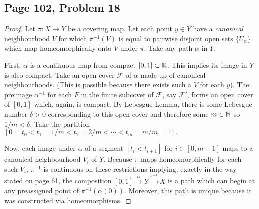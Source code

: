 \subsection*{Page 102, Problem 18}
\vspace{15pt}
\begin{proof}
    \vspace{-10pt}
    Let $\pi\colon X\to Y$ be a covering map. Let each point $y \in Y$ have a \emph{canonical} neighbourhood $V$ for which $\pi^{-1}(V)$ is equal to pairwise disjoint open sets $\{U_\alpha\}$ which map homeomorphically onto $V$ under $\pi$. Take any path $\alpha$ in $Y$.

    First, $\alpha$ is a continuous map from compact $[0,1] \subset \mathbb{R}$. This implies its image in $Y$ is also compact. Take an open cover $\mathscr{F}$ of $\alpha$ made up of canonical neighbourhoods. (This is possible because there exists such a $V$ for each $y$). The preimage $\alpha^{-1}$ for each $F$ in the finite subcover of $\mathscr{F}$, say $\mathscr{F'}$, forms an open cover of $[0,1]$ which, again, is compact. By Lebesgue Lemma, there is some Lebesgue number $\delta > 0$ corresponding to this open cover and therefore some $m \in \mathbb{N}$ so $1/m < \delta.$ Take the partition $[0 = t_0 < t_1 = 1/m < t_2 = 2/m < \cdots < t_m = m/m = 1].$

    Now, each image under $\alpha$ of a segment $[t_i < t_{i+1}]$ for $i \in [0,m-1]$ maps to a canonical neighbourhood $V_i$ of $Y.$ Because $\pi$ maps homeomorphically for each such $V_i$, $\pi^{-1}$ is continuous on these restrictions implying, exactly in the way stated on page 61, the composition $[0,1]\overset{\alpha}\to Y\overset{\pi^{-1}}\to X$ is a path which can begin at any preassigned point of $\pi^{-1}(\alpha(0))$. Moreover, this path is unique because it was constructed via homeomorphisms.
\end{proof}

